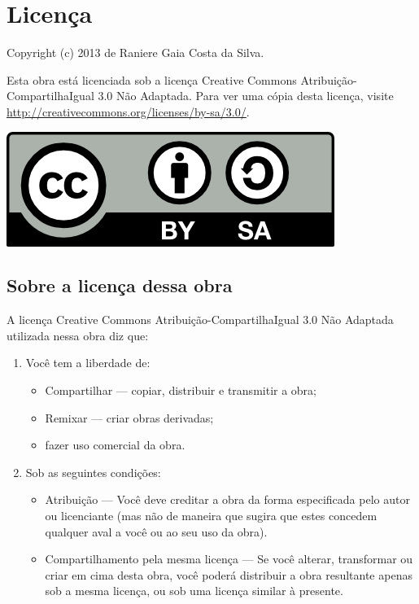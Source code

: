 \chapter{Licença}
Copyright (c) 2013 de Raniere Gaia Costa da Silva.

Esta obra está licenciada sob a licença Creative Commons
Atribuição-CompartilhaIgual 3.0 Não Adaptada. Para ver uma cópia desta licença,
visite \url{http://creativecommons.org/licenses/by-sa/3.0/}.

\begin{center}
  \includegraphics{figures/cc-by-sa.png}
\end{center}

\section{Sobre a licença dessa obra}
A licença Creative Commons Atribuição-CompartilhaIgual 3.0 Não Adaptada
utilizada nessa obra diz que:
\begin{enumerate}
  \item Você tem a liberdade de:
    \begin{itemize}
      \item Compartilhar — copiar, distribuir e transmitir a obra;
      \item Remixar — criar obras derivadas;
      \item fazer uso comercial da obra.
    \end{itemize}
  \item Sob as seguintes condições:
    \begin{itemize}
      \item Atribuição — Você deve creditar a obra da forma especificada pelo
        autor ou licenciante (mas não de maneira que sugira que estes concedem
        qualquer aval a você ou ao seu uso da obra).
      \item Compartilhamento pela mesma licença — Se você alterar, transformar
        ou criar em cima desta obra, você poderá distribuir a obra resultante
        apenas sob a mesma licença, ou sob uma licença similar à presente.
    \end{itemize}
\end{enumerate}
